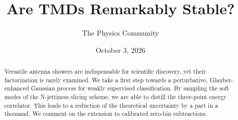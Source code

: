 \documentclass[11pt]{article}
\title{Are TMDs Remarkably Stable?}
\author{The Physics Community}
\date{October 3, 2026}
\numberwithin{equation}{section}
\theoremstyle{definition}
\theoremstyle{remark}
\begin{document}
\maketitle
\begin{abstract}
Versatile antenna showers are indispensable for scientific discovery,
yet their factorization is rarely examined. We take a first step towards
a perturbative, Glauber-enhanced Gaussian process for weakly supervised
classification. By sampling the soft modes of the N-jettiness slicing
scheme, we are able to distill the three-point energy correlator. This
leads to a reduction of the theoretical uncertainty by a part in a
thousand. We comment on the extension to calibrated zero-bin
subtractions.
\end{abstract}
\tableofcontents





\nocite{*}


\end{document}
